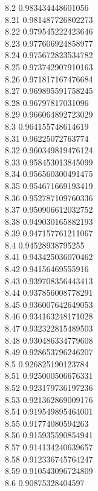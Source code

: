 {8.2	0.983434448601056\\
8.21	0.981487726802273\\
8.22	0.979545222423646\\
8.23	0.977606924858977\\
8.24	0.975672823534782\\
8.25	0.973742907910163\\
8.26	0.971817167476684\\
8.27	0.969895591758245\\
8.28	0.96797817031096\\
8.29	0.966064892723029\\
8.3	0.964155748614619\\
8.31	0.96225072763774\\
8.32	0.960349819476124\\
8.33	0.958453013845099\\
8.34	0.956560300491475\\
8.35	0.954671669193419\\
8.36	0.952787109760336\\
8.37	0.950906612032752\\
8.38	0.949030165882193\\
8.39	0.947157761211067\\
8.4	0.94528938795255\\
8.41	0.943425036070462\\
8.42	0.94156469555916\\
8.43	0.939708356443413\\
8.44	0.937856008778291\\
8.45	0.936007642649053\\
8.46	0.934163248171028\\
8.47	0.932322815489503\\
8.48	0.930486334779608\\
8.49	0.928653796246207\\
8.5	0.926825190123784\\
8.51	0.925000506676331\\
8.52	0.923179736197236\\
8.53	0.921362869009176\\
8.54	0.919549895464001\\
8.55	0.91774080594263\\
8.56	0.915935590854941\\
8.57	0.914134240639657\\
8.58	0.912336745764247\\
8.59	0.910543096724809\\
8.6	0.90875328404597\\
}
